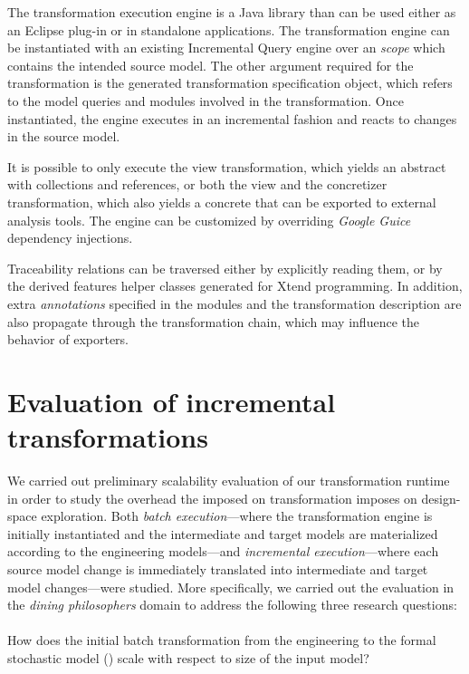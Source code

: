 The transformation execution engine is a Java library than can be used either as an Eclipse plug-in or in standalone applications. The transformation engine can be instantiated with an existing  Incremental Query engine over an \textit{ scope} which contains the intended source model. The other argument required for the transformation is the generated transformation specification object, which refers to the  model queries and  modules involved in the transformation. Once instantiated, the engine executes in an incremental fashion and reacts to changes in the source model.

It is possible to only execute the view transformation, which yields an abstract  with collections and references, or both the view and the concretizer transformation, which also yields a concrete  that can be exported to external analysis tools. The engine can be customized by overriding \emph{Google Guice} dependency injections.

Traceability relations can be traversed either by explicitly reading them, or by the derived features helper classes generated for Xtend programming. In addition, extra \emph{annotations} specified in the  modules and the transformation description are also propagate through the transformation chain, which may influence the behavior of  exporters.

\section{Evaluation of incremental transformations}

We carried out preliminary scalability evaluation of our transformation runtime in order to study the overhead the imposed on transformation imposes on design-space exploration. Both \emph{batch execution}---where the transformation engine is initially instantiated and the intermediate and target  models are materialized according to the engineering models---and \emph{incremental execution}---where each source model change is immediately translated into intermediate and target model changes---were studied. More specifically, we carried out the evaluation in the \emph{dining philosophers} domain to address the following three research questions:
\paragraph{} How does the initial batch transformation from the engineering  to the formal stochastic model () scale with respect to size of the input model?

